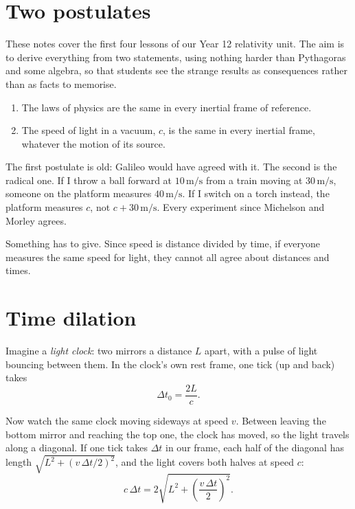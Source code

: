 \section{Two postulates}

These notes cover the first four lessons of our Year 12 relativity unit. The aim is to derive everything from two statements, using nothing harder than Pythagoras and some algebra, so that students see the strange results as consequences rather than as facts to memorise.

\begin{definition}
\begin{enumerate}
  \item The laws of physics are the same in every inertial frame of reference.
  \item The speed of light in a vacuum, $c$, is the same in every inertial frame, whatever the motion of its source.
\end{enumerate}
\end{definition}

The first postulate is old: Galileo would have agreed with it. The second is the radical one. If I throw a ball forward at $10\,\mathrm{m/s}$ from a train moving at $30\,\mathrm{m/s}$, someone on the platform measures $40\,\mathrm{m/s}$. If I switch on a torch instead, the platform measures $c$, not $c + 30\,\mathrm{m/s}$. Every experiment since Michelson and Morley agrees.

Something has to give. Since speed is distance divided by time, if everyone measures the same speed for light, they cannot all agree about distances and times.

\section{Time dilation}

Imagine a \emph{light clock}: two mirrors a distance $L$ apart, with a pulse of light bouncing between them. In the clock's own rest frame, one tick (up and back) takes
\[
  \Delta t_0 = \frac{2L}{c}.
\]

Now watch the same clock moving sideways at speed $v$. Between leaving the bottom mirror and reaching the top one, the clock has moved, so the light travels along a diagonal. If one tick takes $\Delta t$ in our frame, each half of the diagonal has length $\sqrt{L^2 + (v\,\Delta t/2)^2}$, and the light covers both halves at speed $c$:
\[
  c\,\Delta t = 2\sqrt{L^2 + \left(\frac{v\,\Delta t}{2}\right)^2}.
\]


